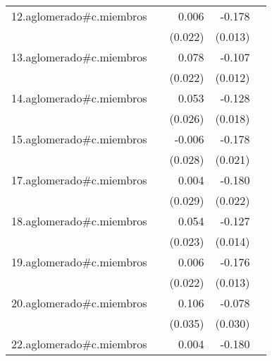 {\begin{longtable}{l*{4}{D{.}{.}{-1}}}
\addlinespace
12.aglomerado#c.miembros&                     &       0.006         &      -0.178\sym{***}&                     \\
            &                     &     (0.022)         &     (0.013)         &                     \\
\addlinespace
13.aglomerado#c.miembros&                     &       0.078\sym{***}&      -0.107\sym{***}&                     \\
            &                     &     (0.022)         &     (0.012)         &                     \\
\addlinespace
14.aglomerado#c.miembros&                     &       0.053\sym{*}  &      -0.128\sym{***}&                     \\
            &                     &     (0.026)         &     (0.018)         &                     \\
\addlinespace
15.aglomerado#c.miembros&                     &      -0.006         &      -0.178\sym{***}&                     \\
            &                     &     (0.028)         &     (0.021)         &                     \\
\addlinespace
17.aglomerado#c.miembros&                     &       0.004         &      -0.180\sym{***}&                     \\
            &                     &     (0.029)         &     (0.022)         &                     \\
\addlinespace
18.aglomerado#c.miembros&                     &       0.054\sym{*}  &      -0.127\sym{***}&                     \\
            &                     &     (0.023)         &     (0.014)         &                     \\
\addlinespace
19.aglomerado#c.miembros&                     &       0.006         &      -0.176\sym{***}&                     \\
            &                     &     (0.022)         &     (0.013)         &                     \\
\addlinespace
20.aglomerado#c.miembros&                     &       0.106\sym{**} &      -0.078\sym{**} &                     \\
            &                     &     (0.035)         &     (0.030)         &                     \\
\addlinespace
22.aglomerado#c.miembros&                     &       0.004         &      -0.180\sym{***}&                     \\

\end{longtable}}
